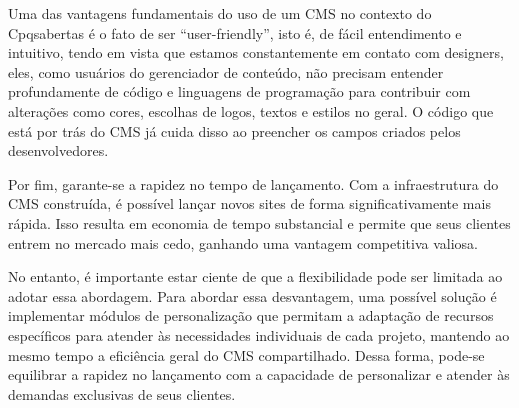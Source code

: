Uma das vantagens fundamentais do uso de um CMS no contexto do Cpqsabertas é o fato de ser “user-friendly”, isto é, de fácil entendimento e intuitivo, tendo em vista que estamos constantemente em contato com designers, eles, como usuários do gerenciador de conteúdo, não precisam entender profundamente de código e linguagens de programação para contribuir com alterações como cores, escolhas de logos, textos e estilos no geral. O código que está por trás do CMS já cuida disso ao preencher os campos criados pelos desenvolvedores.

Por fim, garante-se a rapidez no tempo de lançamento. Com a infraestrutura do CMS construída, é possível lançar novos sites de forma significativamente mais rápida. Isso resulta em economia de tempo substancial e permite que seus clientes entrem no mercado mais cedo, ganhando uma vantagem competitiva valiosa. 

No entanto, é importante estar ciente de que a flexibilidade pode ser limitada ao adotar essa abordagem. Para abordar essa desvantagem, uma possível solução é implementar módulos de personalização que permitam a adaptação de recursos específicos para atender às necessidades individuais de cada projeto, mantendo ao mesmo tempo a eficiência geral do CMS compartilhado. Dessa forma, pode-se equilibrar a rapidez no lançamento com a capacidade de personalizar e atender às demandas exclusivas de seus clientes.